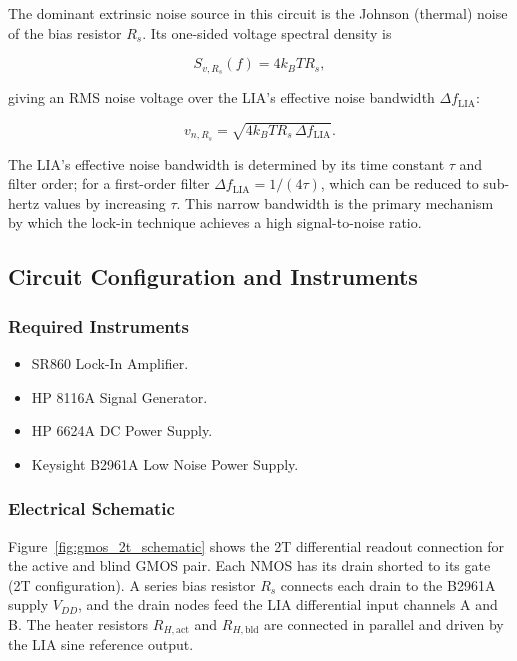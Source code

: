 \documentclass{report}
\begin{document}
The dominant extrinsic noise source in this circuit is the Johnson (thermal)
noise of the bias resistor $R_s$. Its one-sided voltage spectral density is

\begin{equation}
  S_{v,R_s}(f) = 4 k_B T R_s,
  \label{eq:johnson}
\end{equation}

giving an RMS noise voltage over the LIA's effective noise bandwidth
$\Delta f_{\mathrm{LIA}}$:

\begin{equation}
  v_{n,R_s} = \sqrt{4 k_B T R_s\, \Delta f_{\mathrm{LIA}}}.
  \label{eq:johnson_rms}
\end{equation}

The LIA's effective noise bandwidth is determined by its time constant $\tau$
and filter order; for a first-order filter
$\Delta f_{\mathrm{LIA}} = 1/(4\tau)$, which can be reduced to sub-hertz
values by increasing $\tau$. This narrow bandwidth is the primary mechanism
by which the lock-in technique achieves a high signal-to-noise ratio.


\subsection{Circuit Configuration and Instruments}

\subsubsection{Required Instruments}

\begin{itemize}
  \item SR860 Lock-In Amplifier.
  \item HP 8116A Signal Generator.
  \item HP 6624A DC Power Supply.
  \item Keysight B2961A Low Noise Power Supply.
\end{itemize}

\subsubsection{Electrical Schematic}

Figure~\ref{fig:gmos_2t_schematic} shows the 2T differential readout
connection for the active and blind GMOS pair. Each NMOS has its drain
shorted to its gate (2T configuration). A series bias resistor $R_s$
connects each drain to the B2961A supply $V_{DD}$, and the drain nodes feed
the LIA differential input channels A and B. The heater resistors
$R_{H,\mathrm{act}}$ and $R_{H,\mathrm{bld}}$ are connected in parallel and
driven by the LIA sine reference output.
\end{document}
